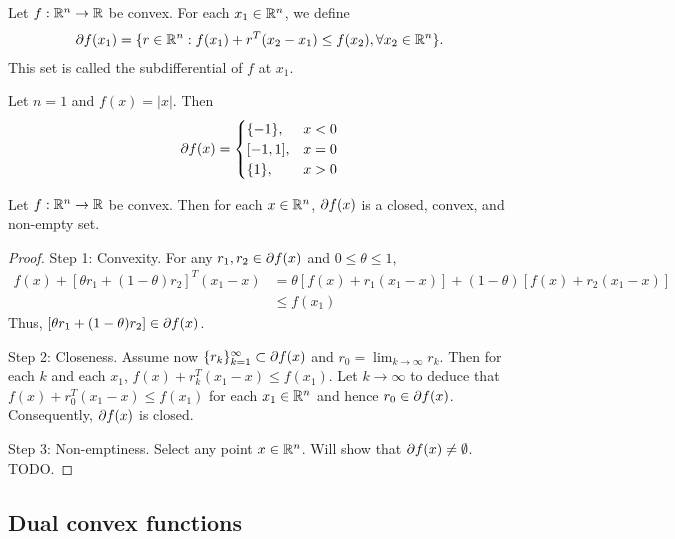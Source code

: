 \begin{definition}[Subdifferential]
Let $f:\mathbb{R}^n \to \mathbb{R}$ be convex.
For each $x_1 \in \mathbb{R}^n$, we define
\begin{align}
\partial f(x_1) = \{ r \in \mathbb{R}^n : f(x_1) + r^T (x_2 - x_1) \le f(x_2), \forall x_2 \in \mathbb{R}^n \}.
\end{align}
This set is called the subdifferential of $f$ at $x_1$.
\end{definition}

\begin{example}
Let $n=1$ and $f(x) = |x|$.
Then
\begin{align}
\partial f(x) = 
\begin{cases}
\{ -1 \}, & x < 0 \\
[-1, 1], & x = 0 \\
\{ 1 \}, & x > 0 \\
\end{cases}
\end{align}
\end{example}

\begin{theorem}
Let $f:\mathbb{R}^n \to \mathbb{R}$ be convex.
Then for each $x \in \mathbb{R}^n$, $\partial f(x)$ is a closed, convex, and non-empty set.
\end{theorem}

\begin{proof}
Step 1:
Convexity.
For any $r_1, r_2 \in \partial f(x)$ and $0 \le \theta \le 1$, 
\begin{align}
f(x) + \left[ \theta r_1 + (1-\theta) r_2 \right]^T (x_1 - x) 
&= \theta \left[ f(x) + r_1 (x_1 - x) \right] + (1-\theta) \left[ f(x) + r_2 (x_1 - x) \right] \\
&\le f(x_1)
\end{align}
Thus, $\left[ \theta r_1 + (1-\theta) r_2 \right] \in \partial f(x)$.

Step 2:
Closeness. 
Assume now $\{r_k\}_{k=1}^{\infty} \subset \partial f(x)$ and $r_0 = \lim_{k \to \infty} r_k$.
Then for each $k$ and each $x_1$, $f(x) + r_k^T (x_1 - x) \le f(x_1)$.
Let $k \to \infty$ to deduce that $f(x) + r_0^T (x_1 - x) \le f(x_1)$ for each $x_1 \in \mathbb{R}^n$ and hence $r_0 \in \partial f(x)$.
Consequently, $\partial f(x)$ is closed.

Step 3:
Non-emptiness.
Select any point $x \in \mathbb{R}^n$. 
Will show that $\partial f(x) \neq \emptyset$.
TODO.

\end{proof}

\subsection{Dual convex functions}

